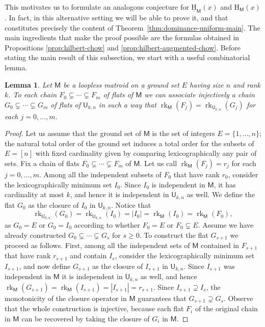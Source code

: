 \documentclass[11pt, a4paper, english]{amsart}
\theoremstyle{teoremas}
\newtheorem{lemma}[theorem]{Lemma}
\theoremstyle{definition}
\DeclareMathOperator{\rk}{rk}
\newcommand{\M}{\mathsf{M}}
\newcommand{\U}{\mathsf{U}}
\renewcommand{\H}{\mathrm{H}}
\newcommand{\uH}{\underline{\mathrm{H}}}
\begin{document}
This motivates us to formulate an analogous conjecture for $\uH_{\M}(x)$ and $\H_{\M}(x)$. In fact, in this alternative setting we will be able to prove it, and that constitutes precisely the content of Theorem~\ref{thm:dominance-uniform-main}. The main ingredients that make the proof possible are the formulas obtained in Propositions \ref{prop:hilbert-chow} and \ref{prop:hilbert-augmented-chow}. Before stating the main result of this subsection, we start with a useful combinatorial lemma.

\begin{lemma}\label{lemma:chains-flats-injection-uniform}
    Let $\M$ be a loopless matroid on a ground set $E$ having size $n$ and rank $k$. To each chain $F_0\subsetneq \cdots \subsetneq F_m$ of flats of $\M$ we can associate injectively a chain $G_0\subsetneq \cdots \subsetneq G_m$ of flats of $\U_{k,n}$ in such a way that $\rk_{\M}(F_j) = \rk_{\U_{k,n}}(G_j)$ for each $j=0,\ldots,m$.
\end{lemma}

\begin{proof}
    Let us assume that the ground set of $\M$ is the set of integers $E=\{1,\ldots,n\}$; the natural total order of the ground set induces a total order for the subsets of $E=[n]$ with fixed cardinality given by comparing lexicographically any pair of sets. Fix a chain of flats $F_0\subsetneq \cdots \subsetneq F_m$ of $\M$. Let us call $\rk_{\M}(F_j) = r_j$ for each $j=0,\ldots,m$. Among all the independent subsets of $F_0$ that have rank $r_0$, consider the lexicographically minimum set $I_0$. Since $I_0$ is independent in $\M$, it has cardinality at most $k$, and hence it is independent in $\U_{k,n}$ as well. We define the flat $G_0$ as the closure of $I_0$ in $\U_{k,n}$. Notice that 
        \[\rk_{\U_{k,n}}(G_0) = \rk_{\U_{k,n}}(I_0) = |I_0| = \rk_{\M}(I_0) = \rk_{\M}(F_0),\]
    as $G_0=E$ or $G_0=I_0$ according to whether $F_0=E$ or $F_0\subsetneq E$. 
    Assume we have already constructed $G_0\subsetneq \cdots \subsetneq G_s$ for $s\geq 0$. To construct the flat $G_{s+1}$ we proceed as follows. First, among all the independent sets of $\M$ contained in $F_{s+1}$ that have rank $r_{s+1}$ and contain $I_s$, consider the lexicographically minimum set $I_{s+1}$, and now define $G_{s+1}$ as the closure of $I_{s+1}$ in $\U_{k,n}$. Since $I_{s+1}$ was independent in $\M$ it is independent in $\U_{k,n}$ as well, and hence $\rk_{\M}(G_{s+1}) = \rk_{\M}(I_{s+1}) = |I_{s+1}| = r_{s+1}$. Since $I_{s+1}\supsetneq I_s$, the monotonicity of the closure operator in $\M$ guarantees that $G_{s+1}\supsetneq G_s$. Observe that the whole construction is injective, because each flat $F_i$ of the original chain in $\M$ can be recovered by taking the closure of $G_i$ in $\M$. 
\end{proof}
\end{document}
